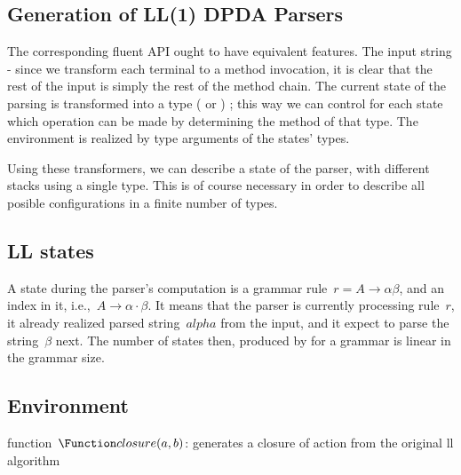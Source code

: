\subsection{Generation of LL(1) DPDA Parsers}
\label{section:generation}
The corresponding \Java fluent API ought to have equivalent features.
The input string - since we transform each
  terminal to a method invocation, it is clear that the rest of the input is
  simply the rest of the method chain.
The current state of the parsing is transformed into a \Java type
  ( or ) ; this way we can control for each state
  which operation can be made by determining the method of that type.
The environment is realized by type arguments of the states' \Java types.

Using these transformers, we can describe a state of the parser,
  with different stacks using a single type.
This is of course necessary in order to describe all posible configurations
  in a finite number of \Java types.

%
\subsection{LL states}
A state during the parser's computation is a grammar rule~$r = A→αβ$, and an
index in it, i.e.,~$A→α·β$.
It means that the parser is currently processing rule~$r$, it already realized parsed string~$alpha$
  from the input, and it expect to parse the string~$β$ next.
The number of states then, produced by \Fajita for a grammar is linear in the grammar size.

\subsection{Environment}

\begin{algorithm}[p]
  \caption{\label{algorithm:llclosure}
  function~$\Function closure(a,b)$: generates a closure of action from the original ll algorithm}
  \begin{algorithmic}
    \FI
      \ELSE[$x$ must be~$b$]
        \BREAK
      \FI
    \DONE
  \end{algorithmic}
\end{algorithm}

\endinput

